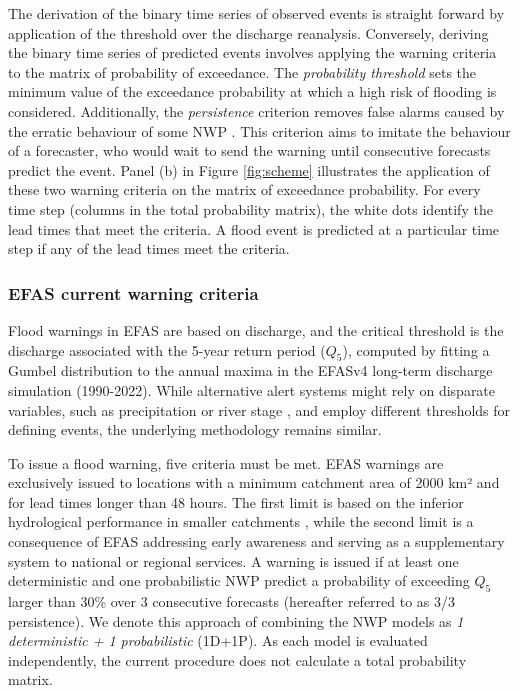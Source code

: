 \documentclass{ametsocV6.1}
\begin{document}
The derivation of the binary time series of observed events is straight forward by application of the  threshold over the discharge reanalysis. Conversely, deriving the binary time series of predicted events involves applying the warning criteria to the matrix of  probability of exceedance. The \textit{probability threshold} sets the minimum value of the exceedance probability at which a high risk of flooding is considered.  Additionally, the \textit{persistence} criterion removes false alarms caused by the erratic behaviour of some NWP \citep{Bartholmes2009}. This criterion aims to imitate the behaviour of a forecaster, who would wait to send the warning until consecutive forecasts predict the event. Panel (b) in Figure \ref{fig:scheme} illustrates the application of these two warning criteria on the matrix of exceedance probability. For every time step (columns in the total probability matrix), the white dots identify the lead times that meet the criteria. A flood event is predicted at a particular time step if any of the lead times meet the criteria.

\subsubsection*{EFAS current warning criteria}
\label{sec:methods_current_criteria}

Flood warnings in EFAS are based on discharge, and the critical threshold is the discharge associated with the 5-year return period ($Q_5$), computed by fitting a Gumbel distribution to the annual maxima in the EFASv4 long-term discharge simulation (1990-2022). While alternative alert systems might rely on disparate variables, such as precipitation \citep{Bouttier2024} or river stage \citep{Nevo2022}, and employ different thresholds for defining events, the underlying methodology remains similar. 

To issue a flood warning, five criteria must be met. EFAS warnings are exclusively issued to locations with a minimum catchment area of 2000 km² and for lead times longer than 48 hours. The first limit is based on the inferior hydrological performance in smaller catchments \citep{Alfieri2014}, while the second limit is a consequence of EFAS addressing early awareness and serving as a supplementary system to national or regional services. A warning is issued if at least one deterministic and one probabilistic NWP predict a probability of exceeding $Q_5$ larger than 30\% over 3 consecutive forecasts (hereafter referred to as 3/3 persistence). We denote this approach of combining the NWP models as  \textit{1 deterministic + 1 probabilistic} (1D+1P). As each model is evaluated independently, the current procedure does not calculate a total probability matrix. 
\end{document}
